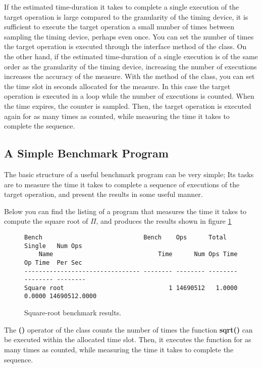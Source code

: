 If the estimated time-duration it takes to complete a single execution
of the target operation is large compared to the granularity of the
timing device, it is sufficient to execute the target operation a
small number of times between sampling the timing device, perhaps even
once. You can set the number of times the target operation is executed
through the  interface method of the
 class. On the other hand, if the estimated
time-duration of a single execution is of the same order as the
granularity of the timing device, increasing the number of executions
increases the accuracy of the measure. With the
 method of the 
class, you can set the time slot in seconds allocated for the
measure. In this case the target operation is executed in a loop while
the number of executions is counted. When the time expires, the
counter is sampled. Then, the target operation is executed again for
as many times as counted, while measuring the time it takes to
complete the sequence.

\subsection*{A Simple Benchmark Program}
The basic structure of a useful benchmark program can be very simple; Its
tasks are to measure the time it takes to complete a sequence of
executions of the target operation, and present the results in some useful
manner.

Below you can find the listing of a program that measures the time it takes
to compute the square root of $\Pi$, and produces the results shown in figure 
\ref{sqrtResults}

\begin{figure}[!hbp]
\begin{verbatim}
Bench                            Bench    Ops      Total    Single   Num Ops
    Name                             Time      Num Ops Time  Op Time  Per Sec
-------------------------------- -------- -------- -------- -------- --------
Square root                             1 14690512   1.0000   0.0000 14690512.0000
\end{verbatim}
\caption{Square-root benchmark results.}\label{sqrtResults}
\end{figure}

The \textbf{()} operator of the  class counts the number
of times the function \textbf{sqrt()} can be executed within the allocated time
slot. Then, it executes the  function for as many times as
counted, while measuring the time it takes to complete the sequence.

